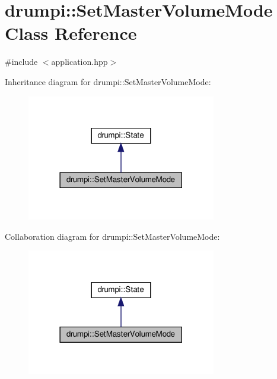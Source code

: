 \hypertarget{classdrumpi_1_1SetMasterVolumeMode}{}\section{drumpi\+:\+:Set\+Master\+Volume\+Mode Class Reference}
\label{classdrumpi_1_1SetMasterVolumeMode}


{\ttfamily \#include $<$application.\+hpp$>$}



Inheritance diagram for drumpi\+:\+:Set\+Master\+Volume\+Mode\+:
\nopagebreak
\begin{figure}[H]
\begin{center}
\leavevmode
\includegraphics[width=234pt]{classdrumpi_1_1SetMasterVolumeMode__inherit__graph}
\end{center}
\end{figure}


Collaboration diagram for drumpi\+:\+:Set\+Master\+Volume\+Mode\+:
\nopagebreak
\begin{figure}[H]
\begin{center}
\leavevmode
\includegraphics[width=234pt]{classdrumpi_1_1SetMasterVolumeMode__coll__graph}
\end{center}
\end{figure}
